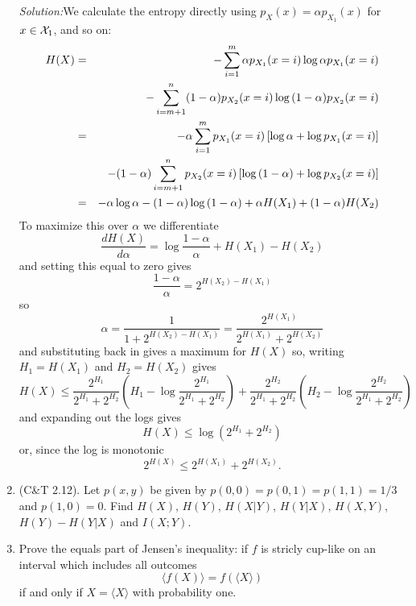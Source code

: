 \documentclass[12pt]{article}
\newcommand{\soln}{\noindent\textit{Solution:}}
\begin{document}
\begin{enumerate}
\soln We calculate the entropy directly using $p_X(x)=\alpha p_{X_1}(x)$ for $x\in{\cal X}_1$, and so on:
\begin{eqnarray}
H(X)&=&-\sum_{i=1}^m \alpha p_{X_1}(x=i)\log{\alpha p_{X_1}(x=i)}\cr&&-\sum_{i=m+1}^n (1-\alpha) p_{X_2}(x=i)\log{(1-\alpha) p_{X_2}(x=i)}\cr 
&=&-\alpha\sum_{i=1}^m p_{X_1}(x=i)\left[\log{\alpha}+\log{p_{X_1}(x=i)}\right] \cr
&&-(1-\alpha)\sum_{i=m+1}^n  p_{X_2}(x=i)\left[\log{(1-\alpha)+\log p_{X_2}(x=i)}\right]\cr
&=&-\alpha\log{\alpha}-(1-\alpha)\log{(1-\alpha)}+\alpha H(X_1)+(1-\alpha)H(X_2)
\end{eqnarray}
To maximize this over $\alpha$ we differentiate 
\begin{equation}
\frac{dH(X)}{d\alpha}=\log{\frac{1-\alpha}{\alpha}}+H(X_1)-H(X_2)
\end{equation}
and setting this equal to zero gives
\begin{equation}
\frac{1-\alpha}{\alpha}=2^{H(X_2)-H(X_1)}
\end{equation}
so
\begin{equation}
\alpha=\frac{1}{1+2^{H(X_2)-H(X_1)}}=\frac{2^{H(X_1)}}{2^{H(X_1)}+2^{H(X_2)}}
\end{equation}
and substituting back in gives a maximum for $H(X)$ so, writing $H_1=H(X_1)$ and $H_2=H(X_2)$ gives
\begin{equation}
H(X)\le \frac{2^{H_1}}{2^{H_1}+2^{H_2}}\left(H_1-\log\frac{2^{H_1}}{2^{H_1}+2^{H_2}}\right)+
\frac{2^{H_2}}{2^{H_1}+2^{H_2}}\left(H_2-\log\frac{2^{H_2}}{2^{H_1}+2^{H_2}}\right)
\end{equation}
and expanding out the logs gives
\begin{equation}
H(X)\le \log{\left(2^{H_1}+2^{H_2}\right)}
\end{equation}
or, since the log is monotonic 
\begin{equation}
2^{H(X)}\le 2^{H(X_1)}+2^{H(X_2)}.
\end{equation}


\item (C\&T 2.12). Let $p(x,y)$ be given by $p(0,0)=p(0,1)=p(1,1)=1/3$
  and $p(1,0)=0$. Find $H(X)$, $H(Y)$, $H(X|Y)$, $H(Y|X)$, $H(X,Y)$,
  $H(Y)-H(Y|X)$ and $I(X;Y)$.





\item Prove the equals part of Jensen's inequality: if $f$ is stricly cup-like on an interval which includes all outcomes
\begin{equation}
\langle f(X)\rangle = f(\langle X\rangle)
\end{equation}
if and only if $X=\langle X\rangle$ with probability one.

\end{enumerate}
\end{document}
